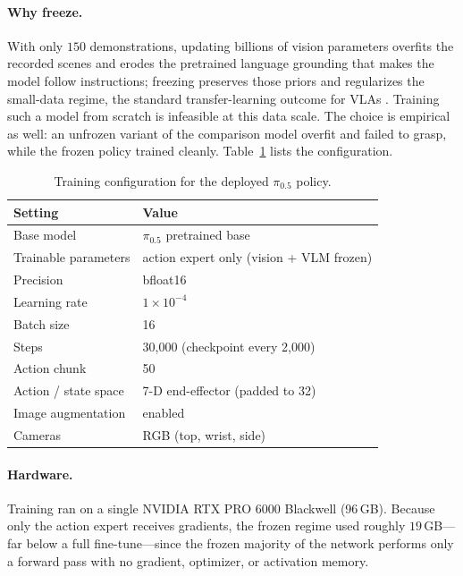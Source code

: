\documentclass[11pt]{article}
\begin{document}
\paragraph{Why freeze.}
With only $150$ demonstrations, updating billions of vision parameters overfits the
recorded scenes and erodes the pretrained language grounding that makes the model
follow instructions; freezing preserves those priors and regularizes the small-data
regime, the standard transfer-learning outcome for VLAs \citep{rt2,openvla}.
Training such a model from scratch is infeasible at this data scale. The choice is
empirical as well: an unfrozen variant of the comparison model overfit and failed
to grasp, while the frozen policy trained cleanly. Table~\ref{tab:config} lists the
configuration.

\begin{table}[H]
  \centering
  \caption{Training configuration for the deployed $\pi_{0.5}$ policy.}
  \label{tab:config}
  \begin{tabular}{ll}
    \toprule
    \textbf{Setting} & \textbf{Value} \\
    \midrule
    Base model            & $\pi_{0.5}$ pretrained base \\
    Trainable parameters  & action expert only (vision + VLM frozen) \\
    Precision             & bfloat16 \\
    Learning rate         & $1\times10^{-4}$ \\
    Batch size            & 16 \\
    Steps                 & 30{,}000 (checkpoint every 2{,}000) \\
    Action chunk          & 50 \\
    Action / state space  & 7-D end-effector (padded to 32) \\
    Image augmentation    & enabled \\
    Cameras               & RGB (top, wrist, side) \\
    \bottomrule
  \end{tabular}
\end{table}

\paragraph{Hardware.}
Training ran on a single NVIDIA RTX PRO 6000 Blackwell (96\,GB). Because only the
action expert receives gradients, the frozen regime used roughly $19$\,GB---far
below a full fine-tune---since the frozen majority of the network performs only a
forward pass with no gradient, optimizer, or activation memory.
\end{document}
